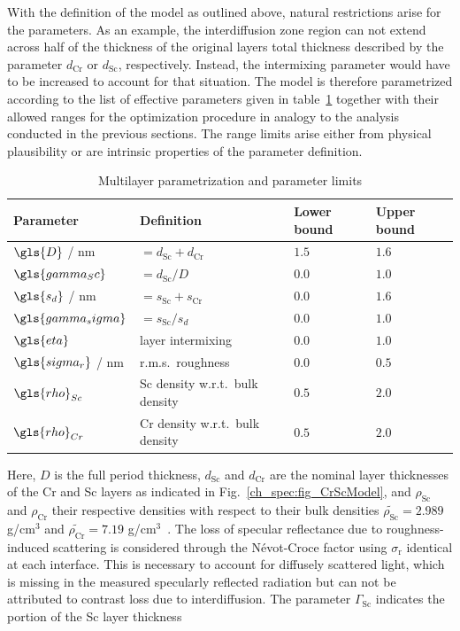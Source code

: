 With the definition of the model as outlined above, natural restrictions arise for the parameters. As an example, the interdiffusion zone region can not extend across half of the thickness of the original layers total thickness described by the parameter $d_\text{Cr}$ or $d_\text{Sc}$, respectively. Instead, the intermixing parameter would have to be increased to account for that situation. The model is therefore parametrized according to the list of effective parameters given in table~\ref{ch_spec:tbl_CrSc_gradual_parametrization} together with their allowed ranges for the optimization procedure in analogy to the analysis conducted in the previous sections. The range limits arise either from physical plausibility or are intrinsic properties of the parameter definition.
\begin{table}[htbp]
\centering
\caption{Multilayer parametrization and parameter limits}
\label{ch_spec:tbl_CrSc_gradual_parametrization}
\begin{tabular}{@{}llll@{}}
\toprule
Parameter & Definition & Lower bound & Upper bound\\ \midrule
$\gls{D}$ / nm & $= d_\text{Sc} + d_\text{Cr}$ & $1.5$&$1.6$ \\ 
$\gls{gamma_Sc}$ & $= d_\text{Sc} / D$&$0.0$ &$1.0$ \\ 
$\gls{s_d}$ / nm&$=s_\text{Sc} + s_\text{Cr}$&$0.0$ & $1.6$\\ 
$\gls{gamma_sigma}$ &$= s_\text{Sc} / s_d$& $0.0$& $1.0$\\ 
$\gls{eta}$ &layer intermixing&$0.0$& $1.0$\\ 
$\gls{sigma_r}$ / nm & r.m.s.~roughness& $0.0$& $0.5$\\ 
$\gls{rho}_{Sc}$ &Sc density w.r.t.~bulk density & $0.5$& $2.0$\\ 
$\gls{rho}_{Cr}$ &Cr density w.r.t.~bulk density& $0.5$& $2.0$\\ 
 \bottomrule
\end{tabular}
\end{table}
Here, $D$ is the full period thickness, $d_\text{Sc}$ and $d_\text{Cr}$ are the 
nominal layer thicknesses of the Cr and Sc layers as indicated in 
Fig.~\ref{ch_spec:fig_CrScModel}, and $\rho_\text{Sc}$ and $\rho_\text{Cr}$ their 
respective densities with respect to their bulk densities 
$\tilde{\rho_\text{Sc}} = 2.989$ g/cm$^3$ and $\tilde{\rho_\text{Cr}} = 7.19$ 
g/cm$^3$~\cite{henke_x-ray_1993}. The loss of specular 
reflectance due to roughness-induced scattering is considered through the 
N\'{e}vot-Croce factor using $\sigma_\text{r}$ identical at each interface. This is necessary to account for diffusely scattered light, which is missing in the measured specularly reflected radiation but can not be attributed to contrast loss due to interdiffusion. The parameter $\Gamma_\text{Sc}$ indicates the portion of the Sc layer thickness 
